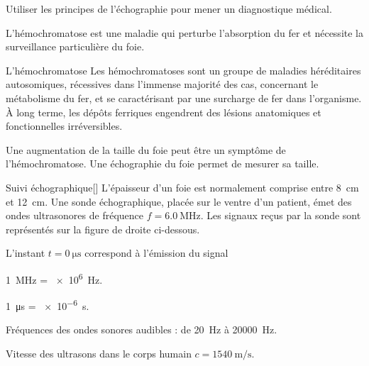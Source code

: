 \teteTermStssImag
{}

\begin{objectifs}
  \item Utiliser les principes de l'échographie pour mener un diagnostique médical.
\end{objectifs}

\begin{contexte}
  L’hémochromatose est une maladie qui perturbe l’absorption du fer et nécessite la surveillance particulière du foie.

\end{contexte}


\begin{doc}{L'hémochromatose}
  Les hémochromatoses sont un groupe de maladies héréditaires autosomiques, 
  récessives dans l'immense majorité des cas,
  concernant le métabolisme du fer,
  et se caractérisant par une surcharge de fer dans l'organisme.
  À long terme, les dépôts ferriques engendrent des lésions anatomiques et fonctionnelles irréversibles.
  
  Une augmentation de la taille du foie peut être un symptôme de l'hémochromatose.
  Une échographie du foie permet de mesurer sa taille.
\end{doc}


\begin{doc}{Suivi échographique}[\label{doc:suivi_echo}]
  L’épaisseur d’un foie est normalement comprise entre \qty{8}{\cm} et \qty{12}{\cm}.
  Une sonde échographique, placée sur le ventre d’un patient,
  émet des ondes  ultrasonores de fréquence $f = \qty{6,0}{\mega\hertz}$.
  Les signaux reçus par la sonde sont représentés sur la figure de droite ci-dessous.

  \begin{center}
  \end{center}
  
  L’instant $t = \qty{0}{\micro\s}$ correspond à l’émission du signal

  \begin{donnees}
    \item \qty{1}{\mega\hertz} = \qty{e6}{\hertz}.
    \item \qty{1}{\micro\s} = \qty{e-6}{\s}.
    \item Fréquences des ondes sonores audibles : de \qty{20}{\hertz} à \qty{20000}{\hertz}.
    \item Vitesse des ultrasons dans le corps humain $c = \qty{1540}{\m\per\s}$.
  \end{donnees}
\end{doc}



